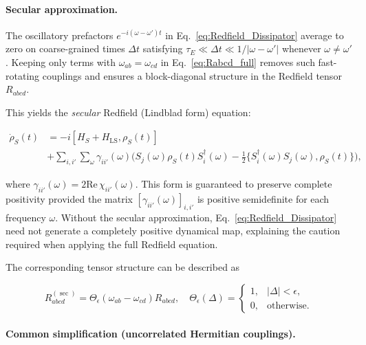 \paragraph{Secular approximation.}

\noindent
The oscillatory prefactors $e^{-i(\omega - \omega') t}$ in Eq.~\eqref{eq:Redfield_Dissipator} average to zero on coarse-grained times $\Delta t$ satisfying $\tau_E \ll \Delta t \ll 1/|\omega - \omega'|$ whenever $\omega \neq \omega'$. 
Keeping only terms with $\omega_{ab}=\omega_{cd}$ in Eq.~\eqref{eq:Rabcd_full} removes such fast-rotating couplings and ensures a block-diagonal structure in the Redfield tensor $R_{abcd}$.

\noindent
This yields the \emph{secular} Redfield (Lindblad form) equation:

\begin{align}
	\dot{\rho}_S(t) & = -i [H_S + H_{\text{LS}}, \rho_S(t)]                                                                                                                                     \\
	                & + \sum_{i,i'} \sum_{\omega} \gamma_{ii'}(\omega) \Big( S_j(\omega) \rho_S(t) S_i^{\dagger}(\omega) - \tfrac{1}{2} \{ S_i^{\dagger}(\omega) S_j(\omega), \rho_S(t) \} \Big),
	\label{eq:Secular_Lindblad_Form}
\end{align}

\noindent
where $\gamma_{ii'}(\omega) = 2 \mathrm{Re}\,\chi_{ii'}(\omega)$. This form is guaranteed to preserve complete positivity provided the matrix $[\gamma_{ii'}(\omega)]_{i,i'}$ is positive semidefinite for each frequency $\omega$. Without the secular approximation, Eq.~\eqref{eq:Redfield_Dissipator} need not generate a completely positive dynamical map, explaining the caution required when applying the full Redfield equation.

\noindent
The corresponding tensor structure can be described as 

\begin{equation}
R_{abcd}^{(\sec)} = \Theta_\epsilon(\omega_{ab} - \omega_{cd}) R_{abcd}, \quad \Theta_\epsilon(\Delta) = \begin{cases} 1, & |\Delta| < \epsilon, \\ 0, & \text{otherwise}. \end{cases}
\end{equation}


\paragraph{Common simplification (uncorrelated Hermitian couplings).}

